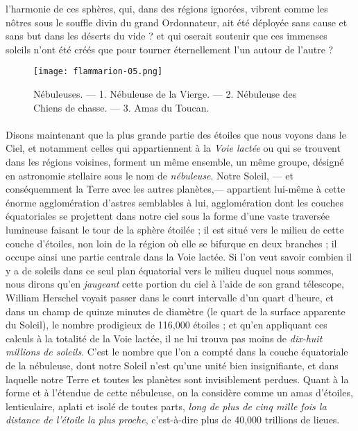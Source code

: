 \documentclass[a4paper, 11pt, oneside]{article}
\begin{document}
l'harmonie de ces sphères, qui, dans des régions ignorées, vibrent comme les nôtres sous le souffle divin du grand Ordonnateur, ait été déployée sans cause et sans but dans les déserts du vide ? et qui oserait soutenir que ces immenses soleils n'ont été créés que pour tourner éternellement l'un autour de l'autre ?
\clearpage
\vspace*{\fill}
\begin{figure}[H]
\centering
\texttt{[image: flammarion-05.png]}
\caption{Nébuleuses. --- 1. Nébuleuse de la Vierge. --- 2. Nébuleuse des Chiens de chasse. --- 3. Amas du Toucan.}
\end{figure}
\vspace*{\fill}
\clearpage
\paragraph{}
Disons maintenant que la plus grande partie des étoiles que nous voyons dans le Ciel, et notamment celles qui appartiennent à la \emph{Voie lactée} ou qui se trouvent dans les régions voisines, forment un même ensemble, un même groupe, désigné en astronomie stellaire sous le nom de \emph{nébuleuse}. Notre Soleil, --- et conséquemment la Terre avec les autres planètes,--- appartient lui-même à cette énorme agglomération d'astres semblables à lui, agglomération dont les couches équatoriales se projettent dans notre ciel sous la forme d'une vaste traversée lumineuse faisant le tour de la sphère étoilée ; il est situé vers le milieu de cette couche d'étoiles, non loin de la région où elle se bifurque en deux branches ; il occupe ainsi une partie centrale dans la Voie lactée. Si l'on veut savoir combien il y a de soleils dans ce seul plan équatorial vers le milieu duquel nous sommes, nous dirons qu'en \emph{jaugeant} cette portion du ciel à l'aide de son grand télescope, William Herschel voyait passer dans le court intervalle d'un quart d'heure, et dans un champ de quinze minutes de diamètre (le quart de la surface apparente du Soleil), le nombre prodigieux de 116,000 étoiles ; et qu'en appliquant ces calculs à la totalité de la Voie lactée, il ne lui trouva pas moins de \emph{dix-huit millions de soleils}. C'est le nombre que l'on a compté dans la couche équatoriale de la nébuleuse, dont notre Soleil n'est qu'une unité bien insignifiante, et dans laquelle notre Terre et toutes les planètes sont invisiblement perdues. Quant à la forme et à l'étendue de cette nébuleuse, on la considère comme un amas d'étoiles, lenticulaire, aplati et isolé de toutes parts, \emph{long de plus de cinq mille fois la distance de l'étoile la plus proche}, c'est-à-dire plus de 40,000 trillions de lieues.
\end{document}
